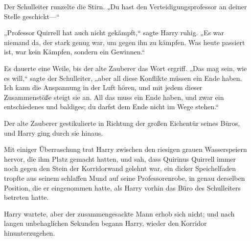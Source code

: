 Der Schulleiter runzelte die Stirn. „Du hast den Verteidigungsprofessor an deiner Stelle geschickt—“

„Professor Quirrell hat auch nicht gekämpft,“ sagte Harry ruhig. „Es war niemand da, der stark genug war, um gegen ihn zu kämpfen. Was heute passiert ist, war kein Kämpfen, sondern ein Gewinnen.“

Es dauerte eine Weile, bis der alte Zauberer das Wort ergriff. „Das mag sein, wie es will,“ sagte der Schulleiter, „aber all diese Konflikte müssen ein Ende haben. Ich kann die Anspannung in der Luft hören, und mit jedem dieser Zusammenstöße steigt sie an. All das muss ein Ende haben, und zwar ein entschiedenes und baldiges; du darfst dem Ende nicht im Wege stehen.“

Der alte Zauberer gestikulierte in Richtung der großen Eichentür seines Büros, und Harry ging durch sie hinaus.

\later

Mit einiger Überraschung trat Harry zwischen den riesigen grauen Wasserspeiern hervor, die ihm Platz gemacht hatten, und sah, dass Quirinus Quirrell immer noch gegen den Stein der Korridorwand gelehnt war, ein dicker Speichelfaden tropfte aus seinem schlaffen Mund auf seine Professorenrobe, in genau derselben Position, die er eingenommen hatte, als Harry vorhin das Büro des Schulleiters betreten hatte.

Harry wartete, aber der zusammengesackte Mann erhob sich nicht; und nach langen unbehaglichen Sekunden begann Harry, wieder den Korridor hinunterzugehen.

